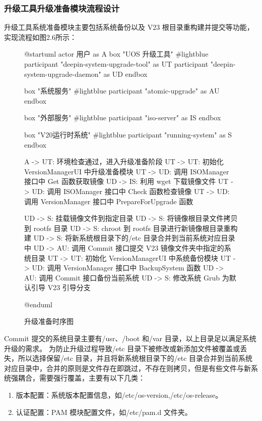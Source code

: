 \documentclass{utart}
\begin{document}
\subsubsection{升级工具升级准备模块流程设计}
升级工具系统准备模块主要包括系统备份以及 V23 根目录重构建并提交等功能，实现流程如图2.6所示：
\begin{figure}[H]
    \centering
    \begin{plantuml}
        @startuml
        actor 用户 as A 
        box "UOS 升级工具" #lightblue
        participant "deepin-system-upgrade-tool" as UT
        participant "deepin-system-upgrade-daemon" as UD                             
        endbox

        box "系统服务" #lightblue 
        participant "atomic-upgrade" as AU
        endbox
        
        box "外部服务" #lightblue
        participant "iso-server" as IS
        endbox

        box "V20运行时系统" #lightblue
        participant "running-system" as S
        endbox

        A -> UT: 环境检查通过，进入升级准备阶段
        UT -> UT: 初始化 VersionManagerUI 中升级准备模块
        UT -> UD: 调用 ISOManager 接口中 Get 函数获取镜像
        UD -> IS: 利用 wget 下载镜像文件
        UT -> UD: 调用 ISOManager 接口中 Check 函数检查镜像
        UT -> UD: 调用 VersionManager 接口中 PrepareForUpgrade 函数
        
        UD -> S: 挂载镜像文件到指定目录
        UD -> S: 将镜像根目录文件拷贝到 rootfs 目录
        UD -> S: chroot 到 rootfs 目录进行新镜像根目录重构建
        UD -> S: 将新系统根目录下的/etc 目录合并到当前系统对应目录中
        UD -> AU: 调用 Commit 接口提交 V23 镜像文件夹中指定的系统目录
        UT -> UT: 初始化 VersionManagerUI 中系统备份模块
        UT -> UD: 调用 VersionManager 接口中 BackupSystem 函数
        UD -> AU: 调用 Commit 接口备份当前系统
        UD -> S: 修改系统 Grub 为默认引导 V23 引导分支

        @enduml
    \end{plantuml}
    \caption{升级准备时序图}
    \label{fig:prepareupgrade}
\end{figure}

Commit 提交的系统目录主要有/usr、/boot 和/var 目录，以上目录足以满足系统升级的需求。
为防止升级过程导致/etc 目录下被修改或新添加文件被覆盖或丢失，所以选择保留/etc 目录，并且将新系统根目录下的/etc 目录合并到当前系统对应目录中，合并的原则是文件存在即跳过，不存在则拷贝，但是有些文件与新系统强耦合，需要强行覆盖，主要有以下几类：
\begin{enumerate}
    \item 版本配置：系统版本配置信息，如/etc/os-version,/etc/os-release。
    \item 认证配置：PAM 模块配置文件，如/etc/pam.d 文件夹。
\end{enumerate}
\end{document}
